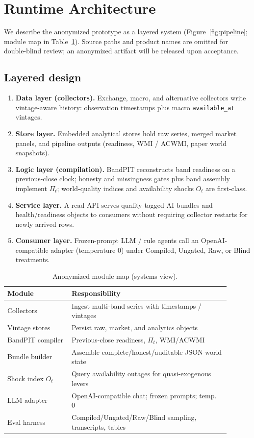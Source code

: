 \documentclass[sigconf,anonymous]{acmart}
\theoremstyle{acmdefinition}%
\theoremstyle{acmplain}%
\begin{document}
\section{Runtime Architecture}
\label{sec:system}

We describe the anonymized prototype as a layered system (Figure~\ref{fig:pipeline}; module map in Table~\ref{tab:modules}). Source paths and product names are omitted for double-blind review; an anonymized artifact will be released upon acceptance.

\subsection{Layered design}
\begin{enumerate}
\item \textbf{Data layer (collectors).} Exchange, macro, and alternative collectors write vintage-aware history: observation timestamps plus macro \texttt{available\_at} vintages.
\item \textbf{Store layer.} Embedded analytical stores hold raw series, merged market panels, and pipeline outputs (readiness, WMI / ACWMI, paper world snapshots).
\item \textbf{Logic layer (compilation).} BandPIT reconstructs band readiness on a previous-close clock; honesty and missingness gates plus band assembly implement \(\Pi_t\); world-quality indices and availability shocks \(O_t\) are first-class.
\item \textbf{Service layer.} A read API serves quality-tagged AI bundles and health/readiness objects to consumers without requiring collector restarts for newly arrived rows.
\item \textbf{Consumer layer.} Frozen-prompt LLM / rule agents call an OpenAI-compatible adapter (temperature \(0\)) under Compiled, Ungated, Raw, or Blind treatments.
\end{enumerate}

\begin{table}[t]
  \caption{Anonymized module map (systems view).}
  \label{tab:modules}
  \small
  \begin{tabular}{p{0.26\linewidth}>{\raggedright\arraybackslash}p{0.64\linewidth}}
    \toprule
    Module & Responsibility \\
    \midrule
    Collectors & Ingest multi-band series with timestamps / vintages \\
    Vintage stores & Persist raw, market, and analytics objects \\
    BandPIT compiler & Previous-close readiness, \(\Pi_t\), WMI/ACWMI \\
    Bundle builder & Assemble complete/honest/auditable JSON world state \\
    Shock index \(O_t\) & Query availability outages for quasi-exogenous levers \\
    LLM adapter & OpenAI-compatible chat; frozen prompts; temp.\ \(0\) \\
    Eval harness & Compiled/Ungated/Raw/Blind sampling, transcripts, tables \\
    \bottomrule
  \end{tabular}
\end{table}
\end{document}

